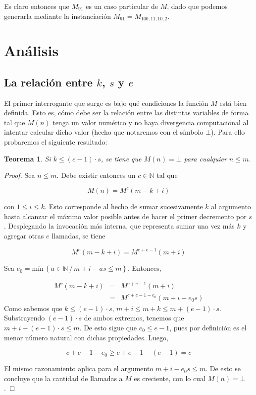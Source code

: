\documentclass[a4paper,10pt]{article}
\newtheorem{teo}{Teorema}
\newcommand{\Mi}[2]{\ensuremath{M^{#2}(#1)}}
\newcommand{\Nat}{\ensuremath{\mathbb{N}}}
\begin{document}
Es claro entonces que $M_{91}$ es un caso particular de $M$, dado que podemos generarla mediante la instanciaci\'on
$M_{91} = M_{100,11,10,2}$.

\section{An\'alisis}

\subsection{La relaci\'on entre $k$, $s$ y $e$}

El primer interrogante que surge es bajo qu\'e condiciones la funci\'on $M$ est\'a bien definida. Esto es, c\'omo debe
ser la relaci\'on entre las distintas variables de forma tal que $M(n)$ tenga un valor num\'erico y no haya divergencia
computacional al intentar calcular dicho valor (hecho que notaremos con el s\'imbolo $\bot$).
Para ello probaremos el siguiente resultado:

\begin{teo}
Si $k \leq (e - 1) \cdot s$, se tiene que $M(n) = \bot$ para cualquier $n \leq m$.
\end{teo}

\begin{proof}
Sea $n \leq m$. Debe existir entonces un $c \in \Nat$ tal que 

$$M(n) = \Mi{m - k + i}{c}$$

con $1 \leq i \leq k$. Esto corresponde al hecho de sumar sucesivamente $k$ al argumento hasta alcanzar el m\'aximo
valor posible antes de hacer el primer decremento por $s$. Desplegando la invocaci\'on m\'as interna, que 
representa sumar una vez m\'as $k$ y agregar otras $e$ llamadas, se tiene

$$\Mi{m - k + i}{c} = \Mi{m + i}{c + e - 1}$$

Sea $e_0 = \text{m\'in} \, \left\{ a \in \Nat \, / \, m + i - as \leq m \right\}$. Entonces,

\begin{eqnarray*}
\Mi{m - k + i}{c} &=& \Mi{m + i}{c + e - 1} \\
                  &=& \Mi{m + i - e_0 s}{c + e - 1 - e_0}
\end{eqnarray*}
Como sabemos que $k \leq (e-1) \cdot s$, $m + i \leq m + k \leq m + (e-1) \cdot s$. Substrayendo $(e-1)\cdot s$ de
ambos extremos, tenemos que $m + i - (e-1)\cdot s \leq m$. De esto sigue que $e_0 \leq e-1$, pues por
definici\'on es el menor n\'umero natural con dichas propiedades. Luego,

$$c + e - 1 - e_0 \geq c + e - 1 - (e-1) = c$$

El mismo razonamiento aplica para el argumento $m + i - e_0 s \leq m$. De esto se concluye que la cantidad de 
llamadas a $M$ es creciente, con lo cual $M(n) = \bot$.
\end{proof}
\end{document}
